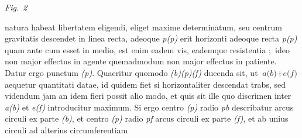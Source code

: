   \vspace{0.5em}%
  \centerline{\lbrack\textit{Fig.~2}\rbrack}%
  \label{LH_35_09_16_019v_Fig.2}%
\newpage
\pstart
\noindent natura\protect{} habeat libertatem eligendi,\protect{}
eliget maxime determinatum,
seu centrum gravitatis\protect{}
descendet in linea recta,
adeoque \textit{p(p)} erit horizonti\protect{}
%
%
adeoque recta \textit{p(p)} 
\protect{}\protect{}
quam ante cum esset in medio,
est enim eadem vis,\protect{}
eademque resistentia\protect{}%
\lbrack;\rbrack\
ideo non major effectus in agente\protect{}%
\protect{}
quemadmodum non major effectus in patiente.\protect{}%
\protect{}
Datur ergo punctum \textit{(p)}.
Quaeritur quomodo \textit{(b)(p)(f)} ducenda sit,
ut $\textit{a(b)} + \textit{e(f)}$ aequetur quantitati datae,
id quidem fiet si horizontaliter descendat trabs,\protect{}
sed videndum jam an idem fieri possit alio modo,
et quis sit ille quo discrimen inter \textit{a(b)} et \textit{e(f)} introducitur maximum.
Si ergo centro \textit{(p)} radio \textit{pb}
describatur arcus circuli\protect{}
ex parte \textit{(b)},
et centro \textit{(p)} radio \textit{pf}
arcus circuli\protect\index{Sachverzeichnis}{arcus circuli}
ex parte \textit{(f)},
et ab unius circuli ad alterius circumferentiam\protect{}
